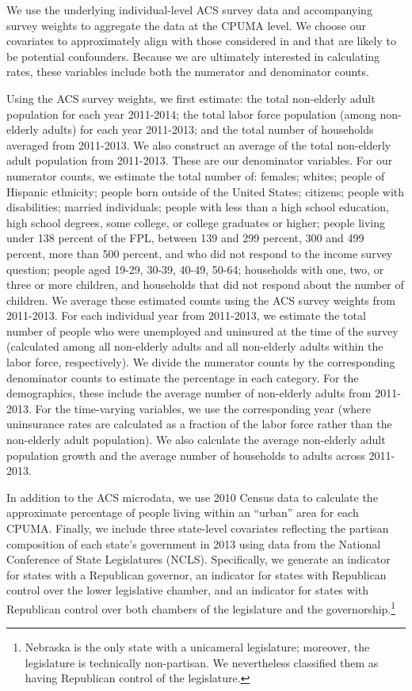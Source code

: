 \documentclass[article]{imsart}
\theoremstyle{plain}
\theoremstyle{remark}
\begin{document}
We use the underlying individual-level ACS survey data and accompanying survey weights to aggregate the data at the CPUMA level. We choose our covariates to approximately align with those considered in \cite{courtemanche2017early} and that are likely to be potential confounders. Because we are ultimately interested in calculating rates, these variables include both the numerator and denominator counts.

Using the ACS survey weights, we first estimate: the total non-elderly adult population for each year 2011-2014; the total labor force population (among non-elderly adults) for each year 2011-2013; and the total number of households averaged from 2011-2013. We also construct an average of the total non-elderly adult population from 2011-2013. These are our denominator variables. For our numerator counts, we estimate the total number of: females; whites; people of Hispanic ethnicity; people born outside of the United States; citizens; people with disabilities; married individuals; people with less than a high school education, high school degrees, some college, or college graduates or higher; people living under 138 percent of the FPL, between 139 and 299 percent, 300 and 499 percent, more than 500 percent, and who did not respond to the income survey question; people aged 19-29, 30-39, 40-49, 50-64; households with one, two, or three or more children, and households that did not respond about the number of children. We average these estimated counts using the ACS survey weights from 2011-2013. For each individual year from 2011-2013, we estimate the total number of people who were unemployed and uninsured at the time of the survey (calculated among all non-elderly adults and all non-elderly adults within the labor force, respectively). We divide the numerator counts by the corresponding denominator counts to estimate the percentage in each category. For the demographics, these include the average number of non-elderly adults from 2011-2013. For the time-varying variables, we use the corresponding year (where uninsurance rates are calculated as a fraction of the labor force rather than the non-elderly adult population). We also calculate the average non-elderly adult population growth and the average number of households to adults across 2011-2013. 

In addition to the ACS microdata, we use 2010 Census data to calculate the approximate percentage of people living within an ``urban'' area for each CPUMA. Finally, we include three state-level covariates reflecting the partisan composition of each state's government in 2013 using data from the National Conference of State Legislatures (NCLS). Specifically, we generate an indicator for states with a Republican governor, an indicator for states with Republican control over the lower legislative chamber, and an indicator for states with Republican control over both chambers of the legislature and the governorship.\footnote{Nebraska is the only state with a unicameral legislature; moreover, the legislature is technically non-partisan. We nevertheless classified them as having Republican control of the legislature.} 
\end{document}
